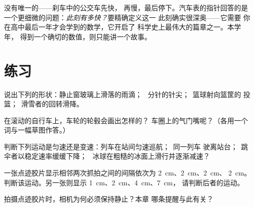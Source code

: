 \begin{remark}[瞬时速度]\label{rem:g6:describing-motion:instant}
没有唯一的——刹车中的公交车先快，
再慢，最后停下。汽车表的指针回答的是
一个更细微的问题：\emph{此刻有多快？}要精确定义这一
此刻确实很深奥——它需要
你在高中最后一年才会学到的数学，它开启了
科学史上最伟大的篇章之一。本学年，
得到一个确切的数值，则只能讲一个故事。
\end{remark}

\section{练习}

\begin{exercise}[$\star$]\label{exo:g6:describing-motion:1}
说出下列的形状：静止窗玻璃上滑落的雨滴；
\ 分针的针尖；\ 篮球射向篮筐的
投篮；\ 滑雪者的回转滑降。
\end{exercise}

\begin{exercise}[$\star$]\label{exo:g6:describing-motion:2}
在滚动的自行车上，车轮的轮毂会画出怎样的？
车圈上的气门嘴呢？（各用一个词与一幅草图作答。）
\end{exercise}

\begin{exercise}[$\star$]\label{exo:g6:describing-motion:3}
判断下列运动是匀速还是变速：列车在站间匀速巡航；\ 同一列车
驶离站台；\ 跳伞者以稳定速率缓缓下降；
\ 冰球在粗糙的冰面上滑行并逐渐减速？
\end{exercise}

\begin{exercise}[$\star$]\label{exo:g6:describing-motion:4}
一张点迹胶片显示相邻两次抓拍之间的间隔依次为 \qty{2}{cm}、\qty{2}{cm}、\qty{2}{cm}、
\qty{2}{cm}。判断该运动。另一张则显示
\qty{1}{cm}、\qty{2}{cm}、\qty{4}{cm}、\qty{7}{cm}，
请判断后者的运动。
\end{exercise}

\begin{exercise}[$\star$]\label{exo:g6:describing-motion:5}
拍摄点迹胶片时，相机为何必须保持静止？本章
哪条提醒与此有关？
\end{exercise}


